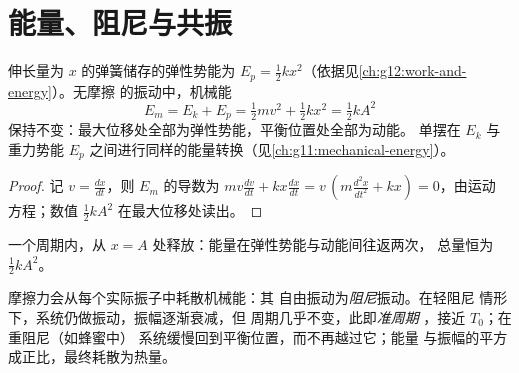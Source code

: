 \section{能量、阻尼与共振}

\begin{proposition}[振子的能量]\label{prop:g12:oscillators-and-time:energy}
伸长量为 $x$ 的弹簧储存的弹性势能为 $E_p =
\tfrac12 kx^2$（依据见\cref{ch:g12:work-and-energy}）。无摩擦
的振动中，机械能
\[
E_m = E_k + E_p = \tfrac12 m v^2 + \tfrac12 k x^2 = \tfrac12 k A^2
\]
保持不变：最大位移处全部为弹性势能，平衡位置处全部为动能。
单摆在 $E_k$ 与重力势能
$E_p$ 之间进行同样的能量转换（见\cref{ch:g11:mechanical-energy}）。
\end{proposition}

\begin{proof}
记 $v = \frac{dx}{dt}$，则 $E_m$ 的导数为 $mv\frac{dv}{dt}
+ kx\frac{dx}{dt} = v\,(m\frac{d^2x}{dt^2} + kx) = 0$，由运动
方程；数值 $\tfrac12 kA^2$ 在最大位移处读出。
\end{proof}

\begin{omfigure}

{\small 一个周期内，从 $x = A$ 处释放：能量在弹性势能与动能间往返两次，
总量恒为 $\tfrac12 kA^2$。}
\end{omfigure}

\begin{definition}[阻尼振动]\label{def:g12:oscillators-and-time:damping}
摩擦力会从每个实际振子中耗散机械能：其
自由振动为\emph{阻尼}振动。在轻阻尼
情形下，系统仍做振动，振幅逐渐衰减，但
周期几乎不变，此即\emph{准周期}%
，接近 $T_0$；在重阻尼（如蜂蜜中）
系统缓慢回到平衡位置，而不再越过它；能量
与振幅的平方成正比，最终耗散为热量。
\end{definition}

